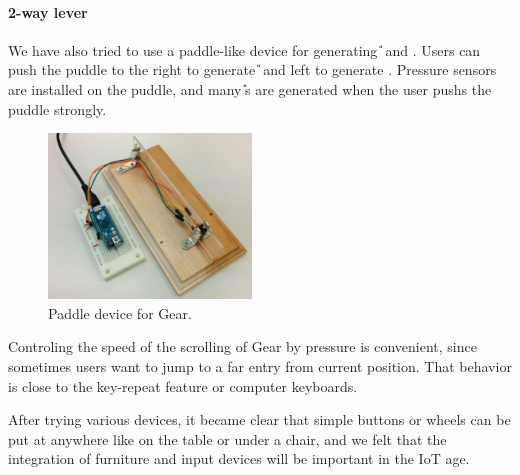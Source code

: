 \documentclass{article}
\begin{document}
\paragraph{2-way lever}

We have also tried to use a paddle-like device for generating {\U} and {\D}.
Users can push the puddle to the right to generate {\U} and
left to generate {\D}.
Pressure sensors are installed on the puddle, and
many {\U}s are generated when the user pushs the puddle strongly.

\begin{figure}[H]
  \centerline{\includegraphics[width=54mm,bb=0 0 514 418]{figures/3c2de63899653056f3c6be835b9aaf43.png}}
\caption{Paddle device for Gear.}
\label{paddle}
\end{figure}

Controling the speed of the scrolling of Gear by pressure is convenient,
since sometimes users want to jump to a far entry from current position.
That behavior is close to the key-repeat feature or computer keyboards.



After trying various devices, it became clear that simple buttons or
wheels can be put at anywhere like on the table or under a chair, and
we felt that the integration of furniture and input devices will be
important in the IoT age.
\end{document}
